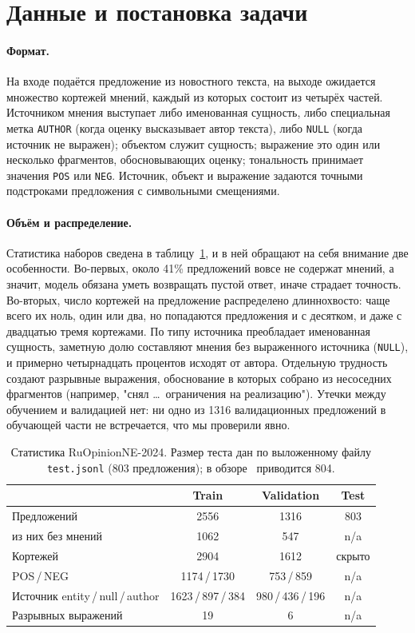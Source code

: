 \documentclass[11pt]{article}
\begin{document}
\section{Данные и постановка задачи}
\paragraph{Формат.}
На входе подаётся предложение из новостного текста, на выходе ожидается множество кортежей мнений, каждый из
которых состоит из четырёх частей. Источником мнения выступает либо именованная сущность, либо специальная метка
\texttt{AUTHOR} (когда оценку высказывает автор текста), либо \texttt{NULL} (когда источник не выражен); объектом
служит сущность; выражение это один или несколько фрагментов, обосновывающих оценку; тональность принимает значения
\texttt{POS} или \texttt{NEG}. Источник, объект и выражение задаются точными подстроками предложения с символьными
смещениями.

\paragraph{Объём и распределение.}
Статистика наборов сведена в таблицу~\ref{tab:data}, и в ней обращают на себя внимание две особенности. Во-первых,
около 41\% предложений вовсе не содержат мнений, а значит, модель обязана уметь возвращать пустой ответ, иначе
страдает точность. Во-вторых, число кортежей на предложение распределено длиннохвосто: чаще всего их ноль, один
или два, но попадаются предложения и с десятком, и даже с двадцатью тремя кортежами. По типу источника преобладает
именованная сущность, заметную долю составляют мнения без выраженного источника (\texttt{NULL}), и примерно
четырнадцать процентов исходят от автора. Отдельную трудность создают разрывные выражения, обоснование в которых
собрано из несоседних фрагментов (например, "снял \dots\ ограничения на реализацию"). Утечки между обучением и
валидацией нет: ни одно из 1316 валидационных предложений в обучающей части не встречается, что мы проверили явно.

\begin{table}[h]
\centering
\caption{Статистика RuOpinionNE-2024. Размер теста дан по выложенному файлу \texttt{test.jsonl}
(803 предложения); в обзоре~\cite{ruopinionne2024} приводится 804.}
\label{tab:data}
\begin{tabular}{lccc}
\toprule
 & Train & Validation & Test \\
\midrule
Предложений & 2556 & 1316 & 803 \\
\quad из них без мнений & 1062 & 547 & n/a \\
Кортежей & 2904 & 1612 & скрыто \\
\quad POS\,/\,NEG & 1174\,/\,1730 & 753\,/\,859 & n/a \\
Источник entity\,/\,null\,/\,author & 1623\,/\,897\,/\,384 & 980\,/\,436\,/\,196 & n/a \\
Разрывных выражений & 19 & 6 & n/a \\
\bottomrule
\end{tabular}
\end{table}
\end{document}
